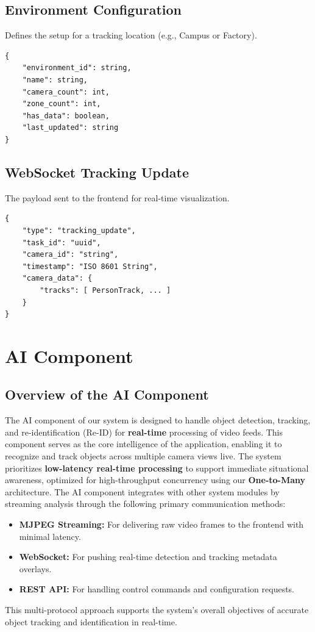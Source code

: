 \subsection{Environment Configuration}
\label{schema:environment}
Defines the setup for a tracking location (e.g., Campus or Factory).
\begin{verbatim}
{
    "environment_id": string,
    "name": string,
    "camera_count": int,
    "zone_count": int,
    "has_data": boolean,
    "last_updated": string
}
\end{verbatim}

\subsection{WebSocket Tracking Update}
\label{schema:ws-update}
The payload sent to the frontend for real-time visualization.
\begin{verbatim}
{
    "type": "tracking_update",
    "task_id": "uuid",
    "camera_id": "string",
    "timestamp": "ISO 8601 String",
    "camera_data": {
        "tracks": [ PersonTrack, ... ]
    }
}
\end{verbatim}

\section{AI Component}
\label{section:ai-component}

\subsection{Overview of the AI Component}
\label{subsection:ai-component-overview}

The AI component of our system is designed to handle object detection, tracking, and re-identification (Re-ID) for \textbf{real-time} processing of video feeds. This component serves as the core intelligence of the application, enabling it to recognize and track objects across multiple camera views live. The system prioritizes \textbf{low-latency real-time processing} to support immediate situational awareness, optimized for high-throughput concurrency using our \textbf{One-to-Many} architecture. The AI component integrates with other system modules by streaming analysis through the following primary communication methods:
\begin{itemize}
    \item \textbf{MJPEG Streaming:} For delivering raw video frames to the frontend with minimal latency.
    \item \textbf{WebSocket:} For pushing real-time detection and tracking metadata overlays.
    \item \textbf{REST API:} For handling control commands and configuration requests.
\end{itemize}
This multi-protocol approach supports the system's overall objectives of accurate object tracking and identification in real-time.

